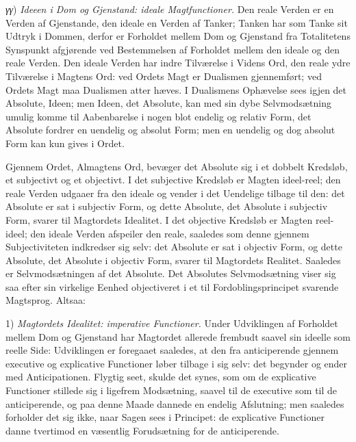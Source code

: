 \documentclass[12pt]{book}
\newcommand{\opage}[1]{\marginnote{\footnotesize\textit{[#1]}}}
\begin{document}
\textit{γγ}) \emph{Ideeen i Dom og Gjenstand: ideale Magtfunctioner.}
Den reale Verden er en Verden af Gjenstande,
den ideale en Verden af Tanker; Tanken har som
Tanke sit Udtryk i Dommen, derfor er Forholdet mellem
Dom og Gjenstand fra Totalitetens Synspunkt afgjørende
ved Bestemmelsen af Forholdet mellem den ideale og den
reale Verden. Den ideale Verden har indre Tilværelse i
Videns Ord, den reale ydre Tilværelse i Magtens Ord: ved
Ordets Magt er Dualismen gjennemført; ved Ordets Magt
maa Dualismen atter hæves. I Dualismens Ophævelse
sees igjen det Absolute, Ideen; men Ideen, det Absolute, kan
med sin dybe Selvmodsætning umulig komme til Aabenbarelse
i nogen blot endelig og relativ Form, det Absolute fordrer
en uendelig og absolut Form; men en uendelig og dog
absolut Form kan kun gives i Ordet.

Gjennem Ordet, Almagtens Ord, bevæger det Absolute
sig i et dobbelt Kredsløb, et subjectivt og et objectivt. I det
subjective Kredsløb er Magten ideel-reel; den reale Verden
udgaaer fra den ideale og vender i det Uendelige tilbage til
\opage{148}den: det Absolute er sat i subjectiv Form, og dette Absolute,
det Absolute i subjectiv Form, svarer til Magtordets Idealitet.
I det objective Kredsløb er Magten reel-ideel; den ideale
Verden afspeiler den reale, saaledes som denne gjennem Subjectiviteten
indkredser sig selv: det Absolute er sat i objectiv
Form, og dette Absolute, det Absolute i objectiv Form, svarer
til Magtordets Realitet. Saaledes er Selvmodsætningen af
det Absolute. Det Absolutes Selvmodsætning viser sig saa
efter sin virkelige Eenhed objectiveret i et til Fordoblingsprincipet
svarende Magtsprog. Altsaa:

1) \emph{Magtordets Idealitet: imperative Functioner.}
Under Udviklingen af Forholdet mellem Dom og
Gjenstand har Magtordet allerede frembudt saavel sin ideelle
som reelle Side: Udviklingen er foregaaet saaledes, at den fra
anticiperende gjennem executive og explicative Functioner løber
tilbage i sig selv: det begynder og ender med Anticipationen.
Flygtig seet, skulde det synes, som om de explicative Functioner
stillede sig i ligefrem Modsætning, saavel til de executive
som til de anticiperende, og paa denne Maade dannede
en endelig Afslutning; men saaledes forholder det sig ikke,
naar Sagen sees i Principet: de explicative Functioner danne
tvertimod en væsentlig Forudsætning for de anticiperende.
\end{document}
